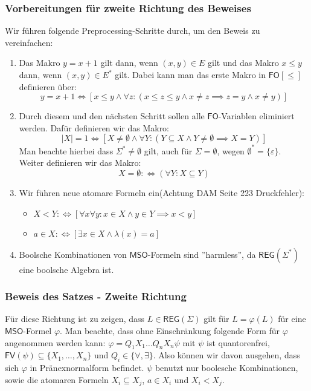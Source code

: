 \documentclass[12pt, german]{article}
\newcommand{\sigstern}{\Sigma^\ast}
\newcommand{\east}{E^{\ast}}
\newcommand{\fv}{\mathsf{FV}}
\newcommand{\fo}{\mathsf{FO}}
\newcommand{\mso}{\mathsf{MSO}}
\newcommand{\reg}{\mathsf{REG}}
\begin{document}
\subsubsection{Vorbereitungen für zweite Richtung des Beweises}
Wir führen folgende Preprocessing-Schritte durch, um den Beweis zu vereinfachen:
	\begin{enumerate}[label= \arabic*.)]
		\item Das Makro $y = x +1$ gilt dann, wenn $(x,y) \in E$ gilt und das Makro $x \leq y$ dann, wenn $(x,y) \in \east$ gilt. 
		Dabei kann man das erste Makro in $\fo[\leq]$ definieren über: 
				$$ y = x +1 \iff [x \leq y \land \forall z : (x \leq z \leq y \land x \not = z \implies z = y \land x \not= y)]$$
		\item Durch diesem und den nächsten Schritt sollen alle $\fo$-Variablen eliminiert werden. Dafür definieren wir das Makro: $$|X| = 1 \iff [X \not =\emptyset \land \forall Y : (Y \subseteq X \land Y \not= \emptyset \implies X = Y) ]$$
		Man beachte hierbei dass $\sigstern \not = \emptyset$  gilt, auch für $ \Sigma = \emptyset$, wegen $\emptyset^\ast = \{\varepsilon\}$.\\
		Weiter definieren wir das Makro:
		$$X=\emptyset :\iff (\forall Y: X \subseteq Y)$$
		\item Wir führen neue atomare Formeln ein(Achtung DAM Seite 223 Druckfehler): 
			\begin{itemize}
				\item $X < Y :\iff [\forall x \forall y : x \in X \land y \in Y \implies x < y]$
				\item $a\in X :\iff [\exists x \in X \land \lambda(x)=a] $
			\end{itemize}
		\item Boolsche Kombinationen von $\mso$-Formeln sind ''harmless'', da $\reg(\sigstern)$ eine boolsche Algebra ist.
	\end{enumerate}

\subsubsection{Beweis des Satzes - Zweite Richtung}
	Für diese Richtung ist zu zeigen, dass $L \in \reg(\Sigma)$ gilt für $L=\varphi(L)$ für eine $\mso$-Formel $\varphi$. 
	Man beachte, dass ohne Einschränkung folgende Form für $\varphi$ angenommen werden kann: $\varphi = Q_1X_1\ldots Q_nX_n\psi$ mit $\psi$ ist quantorenfrei, 
	$\fv(\psi) \subseteq \{X_1, \ldots, X_n\}$ und $Q_i \in \{\forall, \exists\}$.
	Also können wir davon ausgehen, dass sich $\varphi$ in Pränexnormalform befindet. $\psi$ benutzt nur boolesche Kombinationen, sowie die atomaren Formeln
	$X_i \subseteq X_j$, $a \in X_i$ und $X_i < X_j$. \\
	
\end{document}
